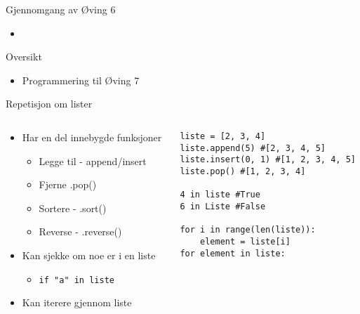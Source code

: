 \documentclass[screen, aspectratio=169]{beamer}
\begin{document}
\begin{frame}{Gjennomgang av Øving 6}
	\begin{itemize}
		\item 
	\end{itemize}
\end{frame}

\begin{frame}{Oversikt}
	\begin{itemize}
		\item Programmering til Øving 7
	\end{itemize}
\end{frame}

\begin{frame}[fragile]{Repetisjon om lister}
	\begin{columns}
		\begin{column}{.4\textwidth}
			\begin{itemize}
				\item Har en del innebygde funksjoner
				\begin{itemize}
					\item Legge til - append/insert
					\item Fjerne .pop()
					\item Sortere - .sort()
					\item Reverse - .reverse() 
				\end{itemize}
				\item Kan sjekke om noe er i en liste%
				\begin{itemize}
				    \item \lstinline|if "a" in liste|
				\end{itemize}
				\item Kan iterere gjennom liste
			
			\end{itemize}
		\end{column}
		\begin{column}{.55\textwidth}
			\begin{lstlisting}
liste = [2, 3, 4]
liste.append(5) #[2, 3, 4, 5]
liste.insert(0, 1) #[1, 2, 3, 4, 5]
liste.pop() #[1, 2, 3, 4]

4 in liste #True
6 in Liste #False

for i in range(len(liste)):
    element = liste[i]
for element in liste:
			\end{lstlisting}
		\end{column}
	\end{columns}
\end{frame}
\end{document}
